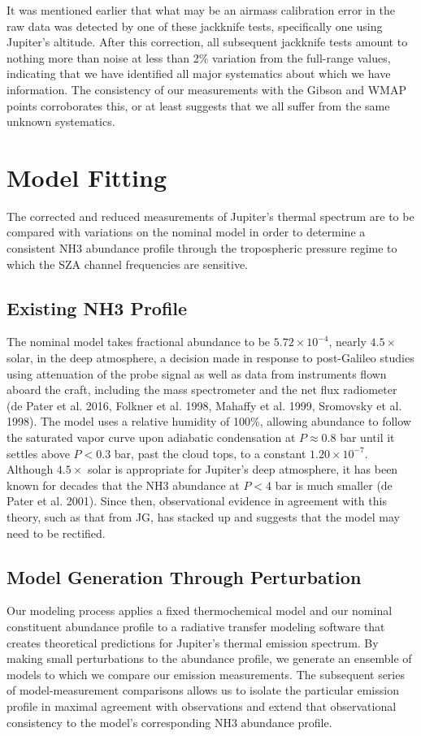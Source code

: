 \documentclass{article}
\newcommand{\e}[1]{\times 10^{#1}}
\begin{document}
	It was mentioned earlier that what may be an airmass calibration error in the raw data was detected by one of these jackknife tests, specifically one using Jupiter's altitude.
	After this correction, all subsequent jackknife tests amount to nothing more than noise at less than 2\% variation from the full-range values, indicating that we have identified all major systematics about which we have information.
	The consistency of our measurements with the Gibson and WMAP points corroborates this, or at least suggests that we all suffer from the same unknown systematics.



\section{Model Fitting} \label{s:model}

	The corrected and reduced measurements of Jupiter's thermal spectrum are to be compared with variations on the nominal model in order to determine a consistent NH3 abundance profile through the tropospheric pressure regime to which the SZA channel frequencies are sensitive.

\subsection{Existing NH3 Profile}
	The nominal model takes fractional abundance to be $5.72 \e{-4}$, nearly $4.5 \times$ solar, in the deep atmosphere, a decision made in response to post-Galileo studies using attenuation of the probe signal as well as data from instruments flown aboard the craft, including the mass spectrometer and the net flux radiometer (de Pater et al. 2016, Folkner et al. 1998, Mahaffy et al. 1999, Sromovsky et al. 1998).
	The model uses a relative humidity of 100\%, allowing abundance to follow the saturated vapor curve upon adiabatic condensation at $P \approx 0.8$ bar until it settles above $P < 0.3$ bar, past the cloud tops, to a constant $1.20\e{-7}$.
	Although $4.5 \times$ solar is appropriate for Jupiter's deep atmosphere, it has been known for decades that the NH3 abundance at $P<4$ bar is much smaller (de Pater et al. 2001).
	Since then, observational evidence in agreement with this theory, such as that from JG, has stacked up and suggests that the model may need to be rectified.

\subsection{Model Generation Through Perturbation}
	Our modeling process applies a fixed thermochemical model and our nominal constituent abundance profile to a radiative transfer modeling software that creates theoretical predictions for Jupiter's thermal emission spectrum.
	By making small perturbations to the abundance profile, we generate an ensemble of models to which we compare our emission measurements.
	The subsequent series of model-measurement comparisons allows us to isolate the particular emission profile in maximal agreement with observations and extend that observational consistency to the model's corresponding NH3 abundance profile.
\end{document}
